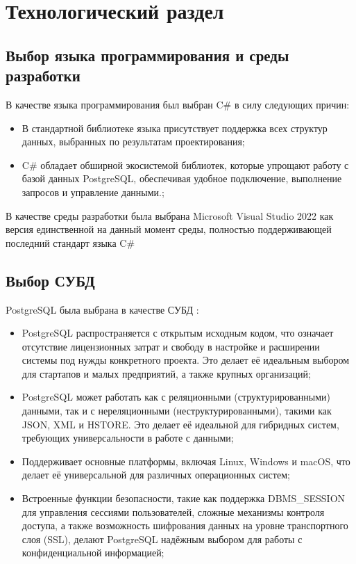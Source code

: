\chapter{Технологический раздел}

\section{Выбор языка программирования и среды разработки}

В качестве языка программирования был выбран C\# в силу следующих причин:

\begin{itemize}[label=---]
	\item В стандартной библиотеке языка присутствует поддержка всех структур данных, выбранных по результатам проектирования;
	\item C\# обладает обширной экосистемой библиотек, которые упрощают работу с базой данных PostgreSQL, обеспечивая удобное подключение, выполнение запросов и управление данными.;
\end{itemize}

В качестве среды разработки была выбрана Microsoft Visual Studio 2022 как версия единственной на данный момент среды, полностью поддерживающей последний стандарт языка C\#

\section{Выбор СУБД}

PostgreSQL была выбрана в качестве СУБД \cite{5}:
\begin{itemize}[label=---]
	\item PostgreSQL распространяется с открытым исходным кодом, что означает отсутствие лицензионных затрат и свободу в настройке и расширении системы под нужды конкретного проекта. Это делает её идеальным выбором для стартапов и малых предприятий, а также крупных организаций;
	\item PostgreSQL может работать как с реляционными (структурированными) данными, так и с нереляционными (неструктурированными), такими как JSON, XML и HSTORE. Это делает её идеальной для гибридных систем, требующих универсальности в работе с данными;
	\item Поддерживает основные платформы, включая Linux, Windows и macOS, что делает её универсальной для различных операционных систем;
	\item Встроенные функции безопасности, такие как поддержка DBMS\_SESSION для управления сессиями пользователей, сложные механизмы контроля доступа, а также возможность шифрования данных на уровне транспортного слоя (SSL), делают PostgreSQL надёжным выбором для работы с конфиденциальной информацией;
\end{itemize}

